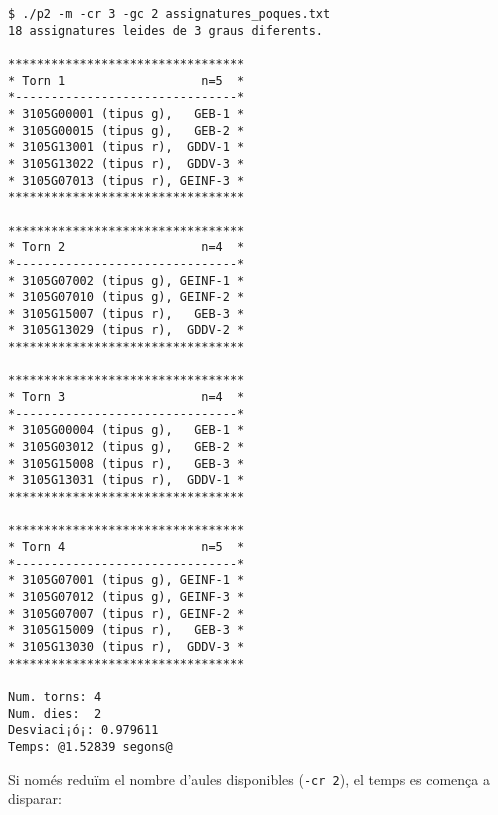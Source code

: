 \documentclass[10pt,a4paper]{../documents/class_material_assignatura_udg}
\begin{document}
\begin{lstlisting}[style=codibash]
$ ./p2 -m -cr 3 -gc 2 assignatures_poques.txt
18 assignatures leides de 3 graus diferents.

*********************************
* Torn 1                   n=5  *
*-------------------------------*
* 3105G00001 (tipus g),   GEB-1 *
* 3105G00015 (tipus g),   GEB-2 *
* 3105G13001 (tipus r),  GDDV-1 *
* 3105G13022 (tipus r),  GDDV-3 *
* 3105G07013 (tipus r), GEINF-3 *
*********************************

*********************************
* Torn 2                   n=4  *
*-------------------------------*
* 3105G07002 (tipus g), GEINF-1 *
* 3105G07010 (tipus g), GEINF-2 *
* 3105G15007 (tipus r),   GEB-3 *
* 3105G13029 (tipus r),  GDDV-2 *
*********************************

*********************************
* Torn 3                   n=4  *
*-------------------------------*
* 3105G00004 (tipus g),   GEB-1 *
* 3105G03012 (tipus g),   GEB-2 *
* 3105G15008 (tipus r),   GEB-3 *
* 3105G13031 (tipus r),  GDDV-1 *
*********************************

*********************************
* Torn 4                   n=5  *
*-------------------------------*
* 3105G07001 (tipus g), GEINF-1 *
* 3105G07012 (tipus g), GEINF-3 *
* 3105G07007 (tipus r), GEINF-2 *
* 3105G15009 (tipus r),   GEB-3 *
* 3105G13030 (tipus r),  GDDV-3 *
*********************************

Num. torns: 4
Num. dies:  2
Desviaci¡ó¡: 0.979611
Temps: @1.52839 segons@
\end{lstlisting}

Si només reduïm el nombre d'aules disponibles (\texttt{-cr 2}), el temps es comença a disparar:
\end{document}
